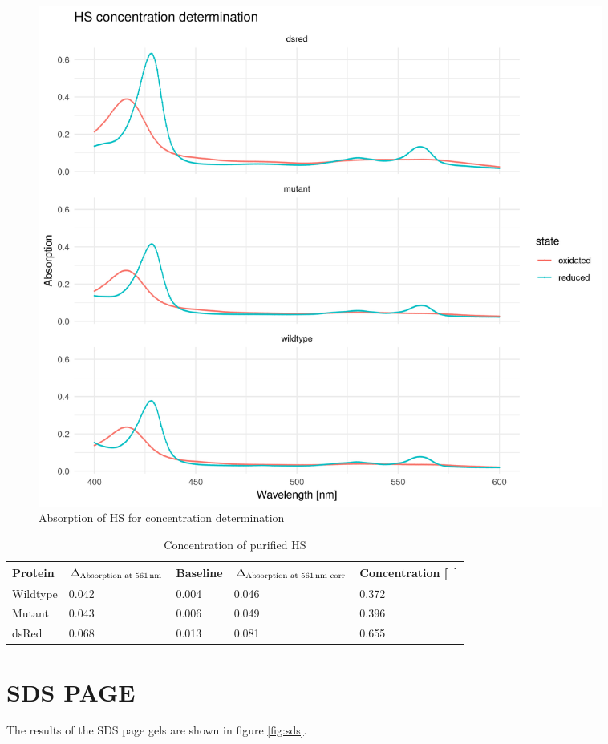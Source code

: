 \begin{figure}
	\centering
	\includegraphics[width=0.9\textwidth]{img/hs_concentration.png}
	\caption{Absorption of HS for concentration determination}
	\label{fig:hs_concentration}
\end{figure}

\begin{table}
	\centering
	\begin{tabu}{lllll}
		\toprule
		Protein & $\Delta_{\text{Absorption at \SI{561}{\nm}}}$ & Baseline & $\Delta_{\text{Absorption at \SI{561}{\nm} corr}}$ & Concentration [\si{\milli\Molar}] \\
		\midrule
		Wildtype & 0.042 & 0.004 & 0.046 & 0.372 \\
		Mutant & 0.043 & 0.006 & 0.049 & 0.396 \\
		dsRed & 0.068 & 0.013 & 0.081 & 0.655 \\
		\bottomrule
	\end{tabu}
	\caption{Concentration of purified HS}
	\label{tbl:hs_concentration}
\end{table}

\section{SDS PAGE}

The results of the SDS page gels are shown in figure \ref{fig:sds}.

